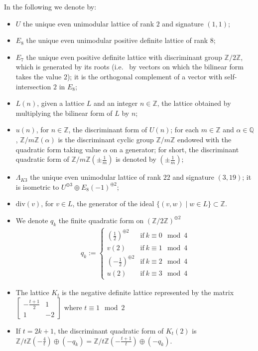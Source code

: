 \documentclass{amsart}
\theoremstyle{definition}
\numberwithin{equation}{section}
\numberwithin{equation}{section} \theoremstyle{definition}
\newcommand\Z{\mathbb{Z}}
\begin{document}
In the following we denote by:
\begin{itemize}
\item $U$ the unique even unimodular lattice of rank $2$ and signature $(1,1)$;
\item $E_8$ the unique even unimodular positive definite lattice of rank $8$;
\item $E_7$ the unique even positive definite lattice with discriminant group
$\mathbb{Z}/2\mathbb{Z}$, which is generated by its roots (i.e.~ by vectors on which
the bilinear form takes the value $2$); it is the orthogonal complement of a vector
with self-intersection $2$ in $E_8$;
\item $L(n)$, given a lattice $L$ and an integer $n\in\mathbb{Z}$, the lattice obtained
by multiplying the bilinear form of $L$ by $n$;
\item $u(n)$, for $n\in\mathbb{Z}$, the discriminant form of $U(n)$; for each
$m\in \mathbb{Z}$ and $\alpha\in \mathbb{Q}$, $\mathbb{Z}/m\Z(\alpha)$ is the
discriminant cyclic group $\mathbb{Z}/m\Z$ endowed with the quadratic form taking value
$\alpha$ on a generator; for short, the discriminant quadratic form of
$\mathbb{Z}/m\Z\!\left(\pm\tfrac{1}{m}\right)$ is denoted by $\left(\pm\tfrac{1}{m}\right)$;
\item $\Lambda_{K3}$ the unique even unimodular lattice of rank $22$ and signature
$(3,19)$; it is isometric to $U^{\oplus 3}\oplus E_8(-1)^{\oplus 2}$;
\item $\mathrm{div}(v)$, for $v\in L$, the generator of the ideal
$\{(v,w)\mid w\in L\}\subset \mathbb{Z}$.
\item We denote $q_k$ the finite quadratic form on $(\Z/2\Z)^{\oplus 2}$
\begin{eqnarray}\label{eq: form qk}q_k:=\left\lbrace\begin{array}{ll}
     \left(\frac{1}{2}\right)^{\oplus 2} &\mathrm{if}\ k\equiv 0\mod 4 \\
v(2)     & \mathrm{if}\ k\equiv 1\mod 4 \\
\left(-\frac{1}{2}\right)^{\oplus 2} &\mathrm{if}\ k\equiv 2\mod 4 \\
u(2)     & \mathrm{if}\ k\equiv 3\mod 4 
\end{array}\right.\end{eqnarray}
\item The lattice $K_t$ is the negative definite lattice represented by the matrix $\left[\begin{array}{cc}-\frac{t+1}{2}&1\\1&-2\end{array}\right]$ where $t\equiv 1\mod 2$
\item 
If $t=2k+1$, the discriminant quadratic form of $K_{t}(2)$ is $\Z/t\Z\left(-\frac{4}{t}\right)\oplus (-q_k)=\Z/t\Z\left(-\frac{t+1}{t}\right)\oplus (-q_k)$.

\end{itemize}
\end{document}
